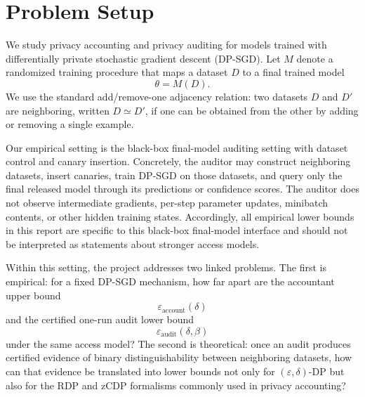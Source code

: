\documentclass[10pt]{article}
\newcommand{\eps}{\varepsilon}
\newcommand{\del}{\delta}
\begin{document}

\section{Problem Setup}

We study privacy accounting and privacy auditing for models trained with differentially private stochastic gradient descent (DP-SGD). Let $M$ denote a randomized training procedure that maps a dataset $D$ to a final trained model
\[
\theta = M(D).
\]
We use the standard add/remove-one adjacency relation: two datasets $D$ and $D'$ are neighboring, written $D \simeq D'$, if one can be obtained from the other by adding or removing a single example.

Our empirical setting is the black-box final-model auditing setting with dataset control and canary insertion. Concretely, the auditor may construct neighboring datasets, insert canaries, train DP-SGD on those datasets, and query only the final released model through its predictions or confidence scores. The auditor does not observe intermediate gradients, per-step parameter updates, minibatch contents, or other hidden training states. Accordingly, all empirical lower bounds in this report are specific to this black-box final-model interface and should not be interpreted as statements about stronger access models.

Within this setting, the project addresses two linked problems. The first is empirical: for a fixed DP-SGD mechanism, how far apart are the accountant upper bound
\[
\eps_{\mathrm{account}}(\delta)
\]
and the certified one-run audit lower bound
\[
\eps_{\mathrm{audit}}(\delta,\beta)
\]
under the same access model? The second is theoretical: once an audit produces certified evidence of binary distinguishability between neighboring datasets, how can that evidence be translated into lower bounds not only for $(\eps,\delta)$-DP but also for the RDP and zCDP formalisms commonly used in privacy accounting?
\end{document}

